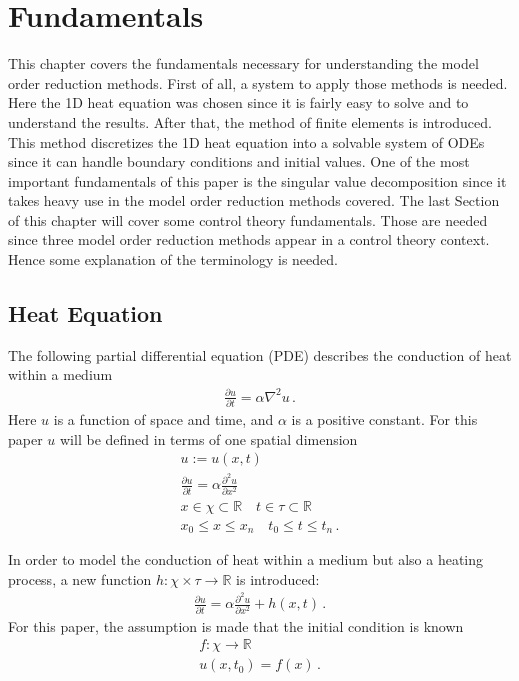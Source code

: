 \chapter{Fundamentals}
This chapter covers the fundamentals necessary for understanding the model order reduction methods. First of all, a system to apply those methods is needed. Here the 1D heat equation was chosen since it is fairly easy to solve and to understand the results. After that, the method of finite elements is introduced. This method discretizes the 1D heat equation into a solvable system of ODEs since it can handle boundary conditions and initial values. One of the most important fundamentals of this paper is the singular value decomposition since it takes heavy use in the model order reduction methods covered. The last Section of this chapter will cover some control theory fundamentals. Those are needed since three model order reduction methods appear in a control theory context. Hence some explanation of the terminology is needed.
\section{Heat Equation} \label{HE}
The following partial differential equation (PDE) describes the conduction of heat  within a medium
\begin{gather}
\frac{\partial u}{\partial t} = \alpha \nabla^{2} u\,. \label{heat}
\end{gather}
Here \(u\) is a function of space and time, and \(\alpha\) is a positive constant.
For this paper \(u\) will be defined in terms of one spatial dimension \cite{Gustafsson2011}
\begin{gather}
u := u(x, t) \\
\frac{\partial u}{\partial t} = \alpha \frac{\partial^{2} u}{\partial x^{2}} \\
x \in \chi \subset \mathbb{R} \quad t \in \tau \subset \mathbb{R} \\
x_{0} \leq x \leq x_{n} \quad t_{0} \leq t \leq t_{n}\,.
\end{gather}

In order to model the conduction of heat within a medium but also a heating process, a new function \(h: \chi \times \tau \rightarrow  \mathbb{R}\) is introduced:
\begin{gather}
\frac{\partial u}{\partial t} = \alpha \frac{\partial^{2} u}{\partial x^{2}} + h(x,t)\,. \label{eq-1d-h}
\end{gather}
For this paper, the assumption is made that the initial condition is known
\begin{gather}
f: \chi \rightarrow \mathbb{R} \\
u(x, t_{0}) = f(x)\,.
\end{gather} 

